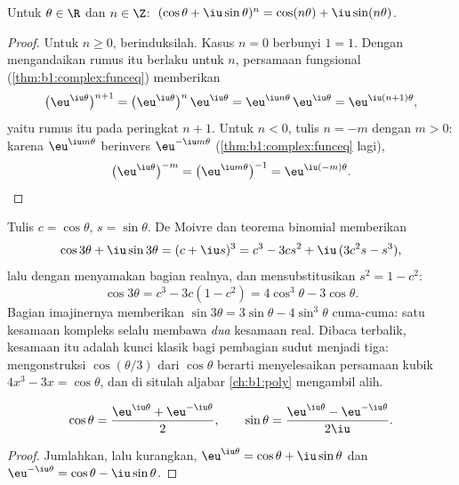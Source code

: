 \begin{corollary}\label{cor:b1:complex:demoivre}
Untuk $\theta \in \R$ dan $n \in \Z$:
$\;(\cos\theta + \iu\sin\theta)^n = \cos(n\theta) +
\iu\sin(n\theta)$.
\end{corollary}

\begin{proof}
Untuk $n \geq 0$, berinduksilah. Kasus $n = 0$ berbunyi $1 = 1$. Dengan mengandaikan
rumus itu berlaku untuk $n$, persamaan fungsional
(\cref{thm:b1:complex:funceq}) memberikan
\[
\bigl(\eu^{\iu\theta}\bigr)^{n+1}
= \bigl(\eu^{\iu\theta}\bigr)^{n}\,\eu^{\iu\theta}
= \eu^{\iu n\theta}\,\eu^{\iu\theta}
= \eu^{\iu(n+1)\theta} ,
\]
yaitu rumus itu pada peringkat $n + 1$. Untuk $n < 0$, tulis $n = -m$
dengan $m > 0$: karena $\eu^{\iu m\theta}$ berinvers
$\eu^{-\iu m\theta}$ (\cref{thm:b1:complex:funceq} lagi),
\[
\bigl(\eu^{\iu\theta}\bigr)^{-m}
= \bigl(\eu^{\iu m\theta}\bigr)^{-1}
= \eu^{\iu(-m)\theta} . \qedhere
\]
\end{proof}

\begin{example}\label{ex:b1:complex:cos3}
Tulis $c = \cos\theta$, $s = \sin\theta$. De Moivre dan teorema
binomial memberikan
\[
\cos 3\theta + \iu \sin 3\theta = (c + \iu s)^3
= c^3 - 3cs^2 + \iu\,(3c^2 s - s^3),
\]
lalu dengan menyamakan bagian realnya, dan mensubstitusikan $s^2 = 1 - c^2$:
\[
\cos 3\theta = c^3 - 3c(1 - c^2) = 4\cos^3\theta - 3\cos\theta .
\]
Bagian imajinernya memberikan $\sin 3\theta = 3\sin\theta -
4\sin^3\theta$ cuma-cuma: satu kesamaan kompleks selalu membawa
\emph{dua} kesamaan real. Dibaca terbalik, kesamaan itu adalah
kunci klasik bagi pembagian sudut menjadi tiga: mengonstruksi
$\cos(\theta/3)$ dari $\cos\theta$ berarti menyelesaikan persamaan kubik $4x^3 -
3x = \cos\theta$, dan di situlah aljabar
\cref{ch:b1:poly} mengambil alih.
\end{example}

\begin{proposition}\label{prop:b1:complex:euler}
\[
\cos\theta = \frac{\eu^{\iu\theta} + \eu^{-\iu\theta}}{2},
\qquad
\sin\theta = \frac{\eu^{\iu\theta} - \eu^{-\iu\theta}}{2\iu}.
\]
\end{proposition}

\begin{proof}
Jumlahkan, lalu kurangkan, $\eu^{\iu\theta} = \cos\theta +
\iu\sin\theta$ dan $\eu^{-\iu\theta} = \cos\theta - \iu\sin\theta$.
\end{proof}

